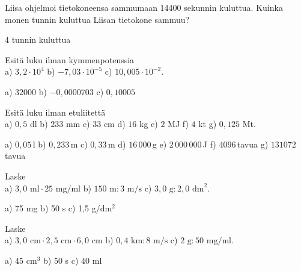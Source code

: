 \begin{tehtavasivu}
\begin{tehtava}
Liisa ohjelmoi tietokoneensa sammumaan 14400 sekunnin kuluttua.
Kuinka monen tunnin kuluttua Liisan tietokone sammuu?
\begin{vastaus}
4 tunnin kuluttua
\end{vastaus}
\end{tehtava}


\begin{tehtava}
Esitä luku ilman kymmenpotenssia \\
a) $3,2 \cdot 10^4$ \quad
b) $-7,03 \cdot 10^{-5}$ \quad
c) $10,005 \cdot 10^{-2}$. \quad
\begin{vastaus}
a) $32000$ \qquad
b) $-0,0000703$ \qquad
c) $0,10005$ \qquad
\end{vastaus}
\end{tehtava}


\begin{tehtava}
Esitä luku ilman etuliitettä \\
a) $0,5$ dl \qquad
b) $233$ mm \qquad
c) $33$ cm \qquad
d) $16$ kg \qquad
e) $2$ MJ \qquad
f) $4$ kt \qquad
g) $0,125$ Mt.
\begin{vastaus}
a) $0,05$\,l \qquad
b) $0,233$\,m \qquad
c) $0,33$\,m \qquad
d) $16\,000$\,g \qquad
e) $2\,000\,000$\,J \qquad
f) $4096$\,tavua \qquad
g) $131072$\,tavua
\end{vastaus}
\end{tehtava}


\begin{tehtava}
Laske \\
a) $3,0 \textrm{ ml} \cdot 25 \textrm{ mg/ml}$ \qquad
b) $150 \textrm{ m} : 3 \textrm{ m/s}$ \qquad
c) $3,0 \textrm{ g} : 2,0 \textrm{ dm}^2$.
\begin{vastaus}
a) 75 mg \qquad
b) 50 s \qquad
c) 1,5 g/dm$^2$
\end{vastaus}
\end{tehtava}

\begin{tehtava}
Laske \\
a) $3,0 \textrm{ cm} \cdot 2,5 \textrm{ cm} \cdot 6,0 \textrm{ cm}$ \qquad
b) $0,4 \textrm{ km} : 8 \textrm{ m/s}$ \qquad
c) $2 \textrm{ g} : 50 \textrm{ mg/ml}$.
\begin{vastaus}
a) 45 cm$^3$ \qquad
b) 50 s \qquad
c) 40 ml
\end{vastaus}
\end{tehtava}


\end{tehtavasivu}
